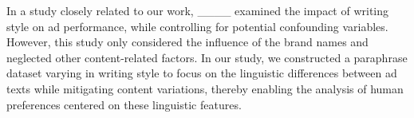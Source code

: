 In a study closely related to our work, ____ examined the impact of writing style on ad performance, while controlling for potential confounding variables. 
However, this study only considered the influence of the brand names and neglected other content-related factors. 
In our study, we constructed a paraphrase dataset varying in writing style to focus on the linguistic differences between ad texts while mitigating content variations, thereby enabling the analysis of human preferences centered on these linguistic features.